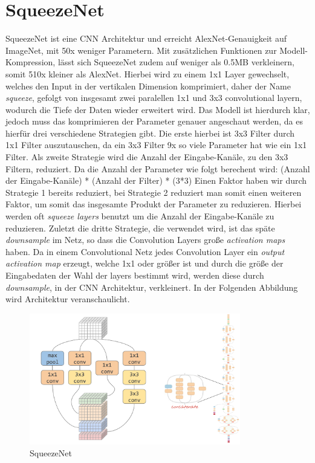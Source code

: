 \section{SqueezeNet}

SqueezeNet ist eine CNN Architektur und erreicht AlexNet-Genauigkeit auf ImageNet, mit 50x weniger Parametern. Mit zusätzlichen Funktionen zur Modell-Kompression, lässt sich SqueezeNet zudem auf weniger als 0.5MB verkleinern, somit 510x kleiner als AlexNet.
\newline Hierbei wird zu einem 1x1 Layer gewechselt, welches den Input in der vertikalen Dimension komprimiert, daher der Name \textit{squeeze}, gefolgt von insgesamt zwei paralellen 1x1 und 3x3 convolutional layern, wodurch die Tiefe der Daten wieder erweitert wird.
\newline Das Modell ist hierdurch klar, jedoch muss das komprimieren der Parameter genauer angeschaut werden, da es hierfür drei verschiedene Strategien gibt. Die erste hierbei ist 3x3 Filter durch 1x1 Filter auszutauschen, da ein 3x3 Filter 9x so viele Parameter hat wie ein 1x1 Filter. Als zweite Strategie wird die Anzahl der Eingabe-Kanäle, zu den 3x3 Filtern, reduziert. Da die Anzahl der Parameter wie folgt berechent wird: 
\newline (Anzahl der Eingabe-Kanäle) * (Anzahl der Filter) * (3*3)
Einen Faktor haben wir durch Strategie 1 bereits reduziert, bei Strategie 2 reduziert man somit einen weiteren Faktor, um somit das insgesamte Produkt der Parameter zu reduzieren. Hierbei werden oft \textit{squeeze layers} benutzt um die Anzahl der Eingabe-Kanäle zu reduzieren. Zuletzt die dritte Strategie, die verwendet wird, ist das späte \textit{downsample} im Netz, so dass die Convolution Layers große \textit{activation maps} haben. Da in einem Convolutional Netz jedes Convolution Layer ein \textit{output activation map} erzeugt, welche 1x1 oder größer ist und durch die größe der Eingabedaten der Wahl der layers bestimmt wird, werden diese durch \textit{downsample}, in der CNN Architektur, verkleinert. In der Folgenden Abbildung wird Architektur veranschaulicht.

\begin{figure}[H]
    \centering
    \includegraphics[width=0.82\textwidth]{Bilder/SqueezeNetModel.png}
    \caption{SqueezeNet}
    \label{fig:SqueezeNet}
\end{figure}
